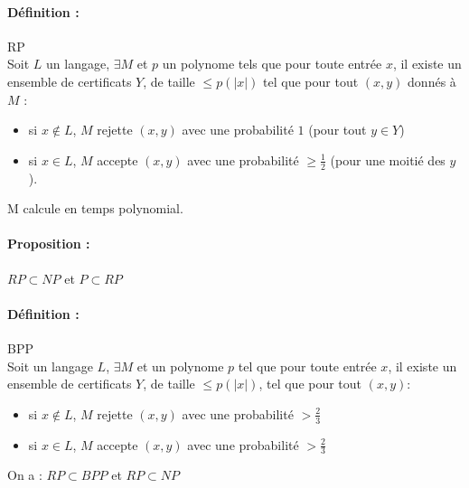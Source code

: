 \documentclass[12pt,a4paper]{report}
\begin{document}
\paragraph{Définition :} RP \\
Soit $L$ un langage, $\exists M$ et $p$ un polynome tels que pour toute entrée $x$, il existe un ensemble de certificats $Y$, de taille $\leqslant p(|x|)$ tel que pour tout $(x,y)$ donnés à $M$ :
\begin{itemize}
\item si $x \not\in L$, $M$ rejette $(x,y)$ avec une probabilité $1$ (pour tout $y \in Y$)
\item si $x \in L$, $M$ accepte $(x,y)$ avec une probabilité $\geqslant \frac{1}{2} $ (pour une moitié des $y$).
\end{itemize}
M calcule en temps polynomial.

\paragraph{Proposition :\\}
$ RP \subset NP $ et $P \subset RP$

\paragraph{Définition :} BPP\\
Soit un langage $L$, $\exists M$ et un polynome $p$ tel que pour toute entrée $x$, il existe un ensemble de certificats $Y$, de taille $\leqslant p(|x|)$, tel que pour tout $(x,y)$:
\begin{itemize}
\item si $x \not\in L$, $M$ rejette $(x,y)$ avec une probabilité $> \frac{2}{3} $
\item si $x \in L$, $M$ accepte $(x,y)$ avec une probabilité $> \frac{2}{3} $
\end{itemize}

On a : $RP \subset BPP$ et $ RP \subset NP $
\end{document}
